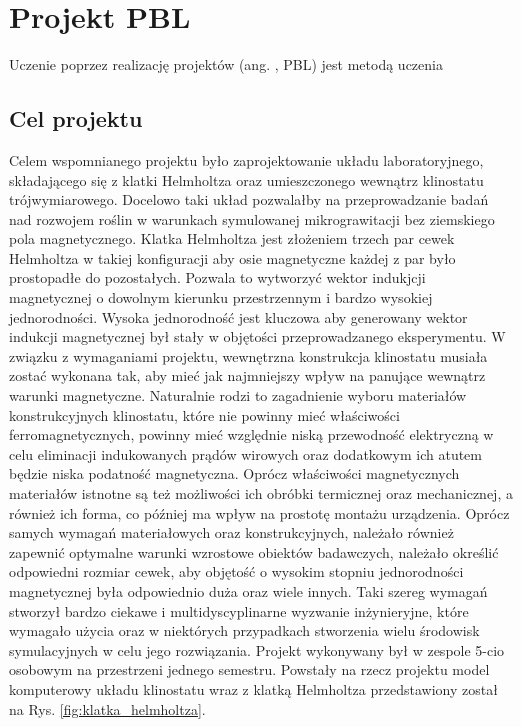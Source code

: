 \graphicspath{{./PBL/images}}

\chapter{Projekt PBL}

Uczenie poprzez realizację projektów (ang. , PBL) jest metodą uczenia 

\section{Cel projektu} \label{cel_projektu}

Celem wspomnianego projektu było zaprojektowanie układu laboratoryjnego, składającego się z klatki Helmholtza oraz umieszczonego wewnątrz klinostatu trójwymiarowego. Docelowo taki układ pozwalałby na przeprowadzanie badań nad rozwojem roślin w warunkach symulowanej mikrograwitacji bez ziemskiego pola magnetycznego. Klatka Helmholtza jest złożeniem trzech par cewek Helmholtza w takiej konfiguracji aby osie magnetyczne każdej z par było prostopadłe do pozostałych. Pozwala to wytworzyć wektor indukjcji magnetycznej o dowolnym kierunku przestrzennym i bardzo wysokiej jednorodności. Wysoka jednorodność jest kluczowa aby generowany wektor indukcji magnetycznej był stały w objętości przeprowadzanego eksperymentu. W związku z wymaganiami projektu, wewnętrzna konstrukcja klinostatu musiała zostać wykonana tak, aby mieć jak najmniejszy wpływ na panujące wewnątrz warunki magnetyczne. Naturalnie rodzi to zagadnienie wyboru materiałów konstrukcyjnych klinostatu, które nie powinny mieć właściwości ferromagnetycznych, powinny mieć względnie niską przewodność elektryczną w celu eliminacji indukowanych prądów wirowych oraz dodatkowym ich atutem będzie niska podatność magnetyczna. Oprócz właściwości magnetycznych materiałów istnotne są też możliwości ich obróbki termicznej oraz mechanicznej, a również ich forma, co później ma wpływ na prostotę montażu urządzenia. Oprócz samych wymagań materiałowych oraz konstrukcyjnych, należało również zapewnić optymalne warunki wzrostowe obiektów badawczych, należało określić odpowiedni rozmiar cewek, aby objętość o wysokim stopniu jednorodności magnetycznej była odpowiednio duża oraz wiele innych. Taki szereg wymagań stworzył bardzo ciekawe i multidyscyplinarne wyzwanie inżynieryjne, które wymagało użycia oraz w niektórych przypadkach stworzenia wielu środowisk symulacyjnych w celu jego rozwiązania. Projekt wykonywany był w zespole 5-cio osobowym na przestrzeni jednego semestru. Powstały na rzecz projektu model komputerowy układu klinostatu wraz z klatką Helmholtza przedstawiony został na Rys. \ref{fig:klatka_helmholtza}.

